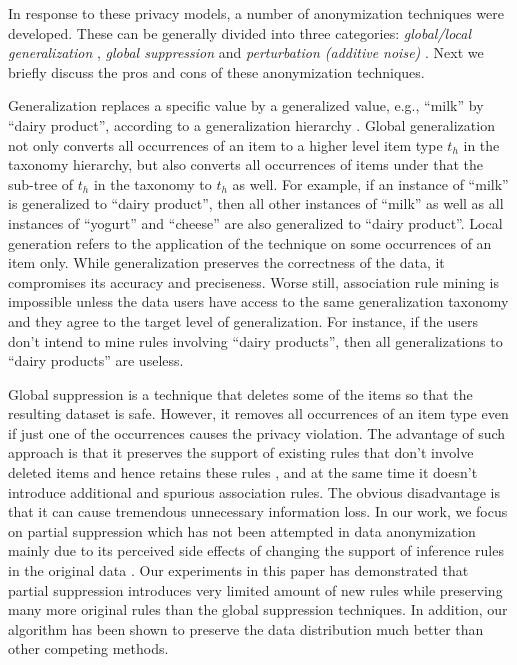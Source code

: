 In response to these privacy models, a number of anonymization techniques
were developed. These can be generally divided into three categories:
{\em global/local generalization}
\cite{Terrovitis:2008:PAS, He:2009:ASD, Cao:2010:rho},
{\em global suppression} \cite{Xu:2008:ATD, Cao:2010:rho} and
{\em perturbation (additive noise)} \cite{Zhang:2007:agg, ChenMFDX11:Diff}.
Next we briefly discuss the pros and cons of these anonymization
techniques.

Generalization replaces a specific value by
a generalized value, e.g., ``milk'' by ``dairy product'',
according to a generalization hierarchy \cite{FungWCY10:Survey}.
Global generalization not only converts all occurrences of an item 
to a higher level item type $t_h$ in the taxonomy hierarchy,  
but also converts all occurrences of items under that the sub-tree of
$t_h$ in the taxonomy to $t_h$ as well. For example, 
if an instance of ``milk'' is generalized to ``dairy product'', 
then all other instances of ``milk'' as well as all instances of
``yogurt'' and ``cheese'' are also generalized to ``dairy product''.
Local generation refers to the application of the technique
on some occurrences of an item only.
While generalization preserves the correctness of the data,
it compromises its accuracy
and preciseness. Worse still, association rule mining is impossible
unless the data users have access to the same generalization taxonomy
and they agree to the target level of generalization. For instance, if
the users don't intend to mine rules involving ``dairy products'', then
all generalizations to ``dairy products'' are useless. 

Global suppression is a technique that deletes some of the items so that the
resulting dataset is safe. However, it removes all occurrences of an item
type even if just one of the occurrences causes the privacy violation.
The advantage of such approach is that it preserves the support of 
existing rules that don't involve deleted items and hence retains these rules 
\cite{Xu:2008:ATD}, and at the same time it doesn't introduce
additional and spurious association rules.
The obvious disadvantage is that it can cause tremendous unnecessary
information loss. In our work, we focus on partial suppression
which has not been attempted in data anonymization
mainly due to its perceived side effects of changing the support of
inference rules in the original data \cite{Xu:2008:ATD, Cao:2010:rho,
tkde:VerykiosEBSD04:ARH, tkde:WuCC07:hiding}. Our experiments in
this paper has demonstrated that partial suppression introduces very limited
amount of new rules while preserving many more original rules than
the global suppression techniques. In addition, our algorithm has
been shown to preserve the data distribution much better than
other competing methods.

